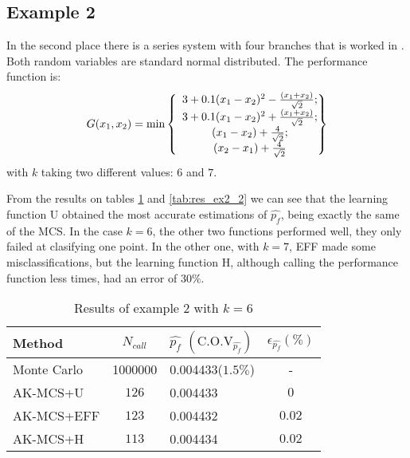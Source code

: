 \subsection{Example 2}
In the second place there is a series system with four branches that is worked in 
\citep{Echard2011}. Both random variables
are standard normal distributed. The performance function is:
\begin{equation}
    G(x_1, x_2) = \text{min}
    \left\lbrace
    \begin{array}{c@{}l}
      3 + 0.1(x_1-x_2)^2 - \frac{(x_1+x_2)}{\sqrt{2}}; \\
      3 + 0.1(x_1-x_2)^2 + \frac{(x_1+x_2)}{\sqrt{2}}; \\
      (x_1-x_2) + \frac{4}{\sqrt{2}}; \\
      (x_2-x_1) + \frac{4}{\sqrt{2}}
    \end{array}
    \right\rbrace
  \end{equation}
with $k$ taking two different values: $6$ and $7$.

From the results on tables \ref{tab:res_ex2} and \ref{tab:res_ex2_2} we can see
that the learning function U obtained the most accurate estimations of $\widehat{p_f}$,
being exactly the same of the MCS. In the case $k=6$, the other two functions performed
well, they only failed at clasifying one point. In the other one, with $k=7$, EFF made some
misclassifications, but the learning function H, although calling the performance function
less times, had an error of $30\%$. \\

\begin{table}[h]
    \footnotesize
    \begin{center}
    \begin{tabular}{lclc}
    \toprule
    Method & $N_{call}$  & $\widehat{p_f}$ $(\text{C.O.V}_{\widehat{p_f}})$ &$\epsilon_{\widehat{p_f}}(\%)$  \\
    \midrule
    Monte Carlo   & \num[round-precision=1,round-mode=figures]{1000000} & \num{0.004433}($1.5\%$) & - \\
    AK-MCS+U & $126$ & \num{0.004433} & $0$ \\
    AK-MCS+EFF & $123$ & \num{0.004432} & $0.02$ \\
    AK-MCS+H & $113$ & \num{0.004434} & $0.02$ \\
    \bottomrule
    \end{tabular}
    \end{center}
    \caption{Results of example 2 with $k=6$}
    \label{tab:res_ex2}
\end{table}

